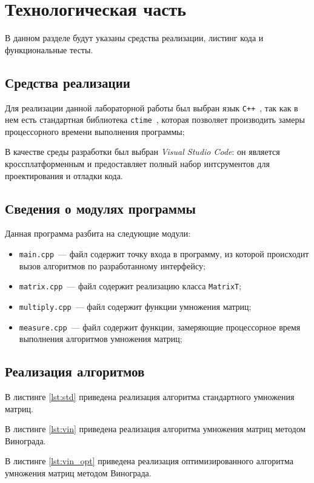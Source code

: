 \chapter{Технологическая часть}
В данном разделе будут указаны средства реализации, листинг кода и функциональные тесты.

\section{Средства реализации}
Для реализации данной лабораторной работы был выбран язык \texttt{C++}~\cite{cpp-lang}, так как в нем есть стандартная библиотека \texttt{ctime}~\cite{cpp-lang}, которая позволяет производить замеры процессорного времени выполнения программы;

В качестве среды разработки был выбран \textit{Visual Studio Code}: он является кроссплатформенным и предоставляет полный набор интсрументов для проектирования и отладки кода.
 
\section{Сведения о модулях программы}
Данная программа разбита на следующие модули:

\begin{itemize}
	\item \texttt{main.cpp}~--- файл содержит точку входа в программу, из которой происходит вызов алгоритмов по разработанному интерфейсу;
	\item \texttt{matrix.cpp}~--- файл содержит реализацию класса \texttt{MatrixT};
	\item \texttt{multiply.cpp}~--- файл содержит функции умножения матриц;
	\item \texttt{measure.cpp}~--- файл содержит функции, замеряющие процессорное время выполнения алгоритмов умножения матриц;
\end{itemize}

\section{Реализация алгоритмов}
В листинге \ref{lst:std} приведена реализация алгоритма стандартного умножения матриц.

В листинге \ref{lst:vin} приведена реализация алгоритма умножения матриц методом Винограда.

В листинге \ref{lst:vin_opt} приведена реализация оптимизированного алгоритма умножения матриц методом Винограда.

